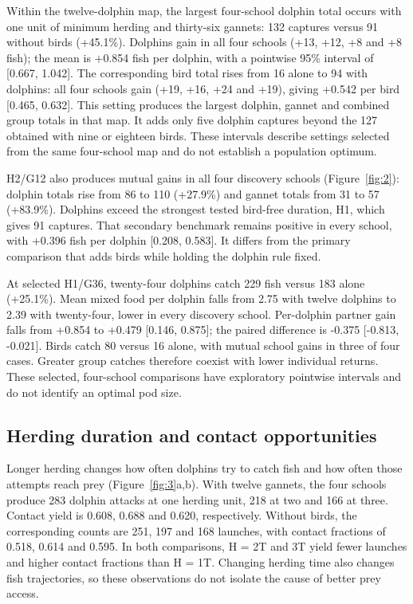 \documentclass[10pt,a4paper,twocolumn]{article}
\begin{document}
Within the twelve-dolphin map, the largest four-school dolphin total occurs with one unit of minimum herding and thirty-six gannets: 132 captures versus 91 without birds (+45.1\%). Dolphins gain in all four schools (+13, +12, +8 and +8 fish); the mean is +0.854 fish per dolphin, with a pointwise 95\% interval of [0.667, 1.042]. The corresponding bird total rises from 16 alone to 94 with dolphins: all four schools gain (+19, +16, +24 and +19), giving +0.542 per bird [0.465, 0.632]. This setting produces the largest dolphin, gannet and combined group totals in that map. It adds only five dolphin captures beyond the 127 obtained with nine or eighteen birds. These intervals describe settings selected from the same four-school map and do not establish a population optimum.

H2/G12 also produces mutual gains in all four discovery schools (Figure~\ref{fig:2}): dolphin totals rise from 86 to 110 (+27.9\%) and gannet totals from 31 to 57 (+83.9\%). Dolphins exceed the strongest tested bird-free duration, H1, which gives 91 captures. That secondary benchmark remains positive in every school, with +0.396 fish per dolphin [0.208, 0.583]. It differs from the primary comparison that adds birds while holding the dolphin rule fixed.

At selected H1/G36, twenty-four dolphins catch 229 fish versus 183 alone (+25.1\%). Mean mixed food per dolphin falls from 2.75 with twelve dolphins to 2.39 with twenty-four, lower in every discovery school. Per-dolphin partner gain falls from +0.854 to +0.479 [0.146, 0.875]; the paired difference is -0.375 [-0.813, -0.021]. Birds catch 80 versus 16 alone, with mutual school gains in three of four cases. Greater group catches therefore coexist with lower individual returns. These selected, four-school comparisons have exploratory pointwise intervals and do not identify an optimal pod size.

\subsection{Herding duration and contact opportunities}
Longer herding changes how often dolphins try to catch fish and how often those attempts reach prey (Figure~\ref{fig:3}a,b). With twelve gannets, the four schools produce 283 dolphin attacks at one herding unit, 218 at two and 166 at three. Contact yield is 0.608, 0.688 and 0.620, respectively. Without birds, the corresponding counts are 251, 197 and 168 launches, with contact fractions of 0.518, 0.614 and 0.595. In both comparisons, H = 2T and 3T yield fewer launches and higher contact fractions than H = 1T. Changing herding time also changes fish trajectories, so these observations do not isolate the cause of better prey access.
\end{document}
